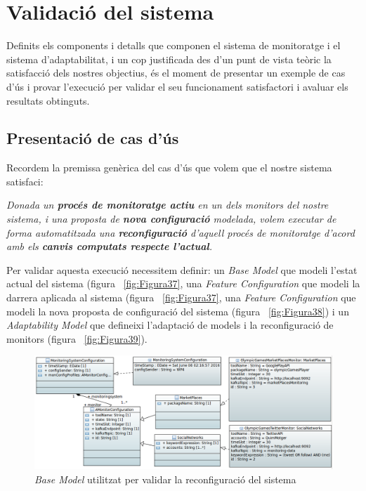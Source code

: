 
\chapter{Validació del sistema} %

Definits els components i detalls que componen el sistema de monitoratge i el sistema d'adaptabilitat, i un cop justificada des d'un punt de vista teòric la satisfacció dels nostres objectius, és el moment de presentar un exemple de cas d'ús i provar l'execució per validar el seu funcionament satisfactori i avaluar els resultats obtinguts.

\section{Presentació de cas d'ús}

Recordem la premissa genèrica del cas d'ús que volem que el nostre sistema satisfaci:

\begin{center}
\textit{Donada un \textbf{procés de monitoratge actiu} en un dels monitors del nostre sistema, i una proposta de \textbf{nova configuració} modelada, volem executar de forma automatitzada una \textbf{reconfiguració} d'aquell procés de monitoratge d'acord amb els \textbf{canvis computats respecte l'actual}.}
\end{center}

Per validar aquesta execució necessitem definir: un \textit{Base Model} que modeli l'estat actual del sistema (figura ~\ref{fig:Figura37}, una \textit{Feature Configuration} que modeli la darrera aplicada al sistema (figura ~\ref{fig:Figura37}, una \textit{Feature Configuration} que modeli la nova proposta de configuració del sistema (figura ~\ref{fig:Figura38}) i un \textit{Adaptability Model} que defineixi l'adaptació de models i la reconfiguració  de monitors (figura ~\ref{fig:Figura39}).\\

\begin{figure}
\centering
\includegraphics[width=14cm]{Figures/Figure16}
\decoRule
\caption{\textit{Base Model} utilitzat per validar la reconfiguració del sistema}
\label{fig:Figura36}
\end{figure} 

